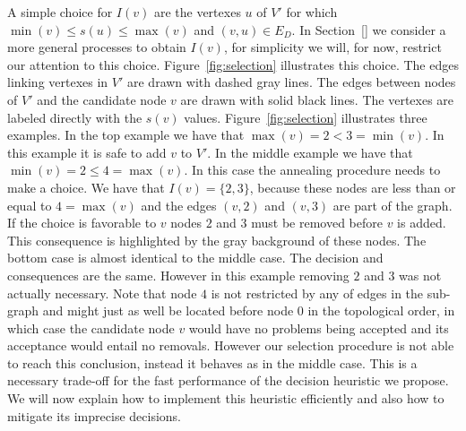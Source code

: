 \documentclass[a4paper]{article}
\begin{document}
 A simple choice for $I(v)$ are the vertexes $u$ of $V'$ for which
 $\min(v) \leq s(u) \leq \max(v)$ and $(v,u) \in E_D$. In Section~\ref{} we
 consider a more general processes to obtain $I(v)$, for simplicity we
 will, for now, restrict our attention to this choice.
 Figure~\ref{fig:selection} illustrates this choice. The edges linking
 vertexes in $V'$ are drawn with dashed gray lines. The edges between nodes
 of $V'$ and the candidate node $v$ are drawn with solid black lines. The
 vertexes are labeled directly with the $s(v)$
 values. Figure~\ref{fig:selection} illustrates three examples. In the top
 example we have that $\max(v) = 2 < 3 = \min(v)$. In this example it is
 safe to add $v$ to $V'$. In the middle example we have that
 $\min(v) = 2 \leq 4 = \max(v)$. In this case the annealing procedure needs
 to make a choice. We have that $I(v) = \{2, 3\}$, because these nodes are
 less than or equal to $4 = \max(v)$ and the edges $(v, 2)$ and $(v, 3)$
 are part of the graph. If the choice is favorable to $v$ nodes $2$ and $3$
 must be removed before $v$ is added. This consequence is highlighted by
 the gray background of these nodes. The bottom case is almost identical to
 the middle case. The decision and consequences are the same. However in
 this example removing $2$ and $3$ was not actually necessary. Note that
 node $4$ is not restricted by any of edges in the sub-graph and might just
 as well be located before node $0$ in the topological order, in which case
 the candidate node $v$ would have no problems being accepted and its
 acceptance would entail no removals. However our selection procedure is
 not able to reach this conclusion, instead it behaves as in the middle
 case. This is a necessary trade-off for the fast performance of the
 decision heuristic we propose. We will now explain how to implement this
 heuristic efficiently and also how to mitigate its imprecise decisions.
%
\end{document}
